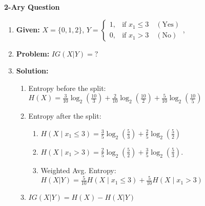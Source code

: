 \begin{example} \textbf{2-Ary Question}
    \begin{enumerate}
        \item \textbf{Given:} $X= \{0,1,2\}$, $Y = 
        \begin{cases} 
        1, & \text{if } x_1 \leq 3 \quad (\text{Yes}) \\
        0, & \text{if } x_1 > 3 \quad (\text{No})
        \end{cases}$, 
        \item \textbf{Problem:} $IG(X|Y) = ?$
        \item \textbf{Solution:}
        \begin{enumerate}
            \item Entropy before the split: $H(X) = \frac{3}{10} \log_2\left(\frac{10}{3}\right) + \frac{2}{10} \log_2\left(\frac{10}{2}\right) + \frac{5}{10} \log_2\left(\frac{10}{5}\right)$
            \item Entropy after the split: 
            \begin{enumerate}
                \item $H(X \mid x_1 \leq 3) = \frac{3}{5} \log_2 \left(\frac{5}{3}\right) + \frac{2}{5} \log_2 \left(\frac{5}{2}\right)$ 
                \item $H(X \mid x_1 > 3) = \frac{2}{5} \log_2 \left(\frac{5}{2}\right) + \frac{3}{5} \log_2 \left(\frac{5}{3}\right)$.
                \item Weighted Avg. Entropy: $H(X|Y) = \frac{5}{10} H(X \mid x_1 \leq 3) + \frac{5}{10} H(X \mid x_1 > 3)$
            \end{enumerate}
            \item $IG(X|Y) = H(X) - H(X|Y)$
        \end{enumerate}
    \end{enumerate}
\end{example}

